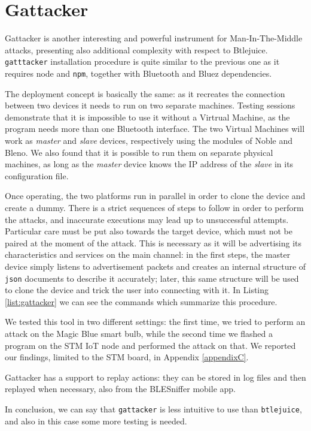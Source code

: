 \section{Gattacker}
Gattacker \cite{gattacker-repo} is another interesting and powerful instrument for Man-In-The-Middle attacks, presenting also additional complexity with respect to Btlejuice. \texttt{gatttacker} installation procedure is quite similar to the previous one as it requires node and \texttt{npm}, together with Bluetooth and Bluez dependencies.

The deployment concept is basically the same: as it recreates the connection between two devices it needs to run on two separate machines. Testing sessions demonstrate that it is impossible to use it without a Virtrual Machine, as the program needs more than one Bluetooth interface. The two Virtual Machines will work as \textit{master} and \textit{slave} devices, respectively using the modules of Noble and Bleno. We also found that it is possible to run them on separate physical machines, as long as the \textit{master} device knows the IP address of the \textit{slave} in its configuration file.

Once operating, the two platforms run in parallel in order to clone the device and create a dummy.
There is a strict sequences of steps to follow in order to perform the attacks, and inaccurate executions may lead up to unsuccessful attempts. Particular care must be put also towards the target device, which must not be paired at the moment of the attack. This is necessary as it will be advertising its characteristics and services on the main channel: in the first steps, the master device simply listens to advertisement packets and creates an internal structure of \texttt{json} documents to describe it accurately; later, this same structure will be used to clone the device and trick the user into connecting with it. In Listing \ref{list:gattacker} we can see the commands which summarize this procedure.


We tested this tool in two different settings: the first time, we tried to perform an attack on the Magic Blue smart bulb, while the second time we flashed a program on the STM IoT node and performed the attack on that. We reported our findings, limited to the STM board, in Appendix \ref{appendixC}.

Gattacker has a support to replay actions: they can be stored in log files and then replayed when necessary, also from the BLESniffer mobile app.

In conclusion, we can say that \texttt{gattacker} is less intuitive to use than \texttt{btlejuice}, and also in this case some more testing is needed.